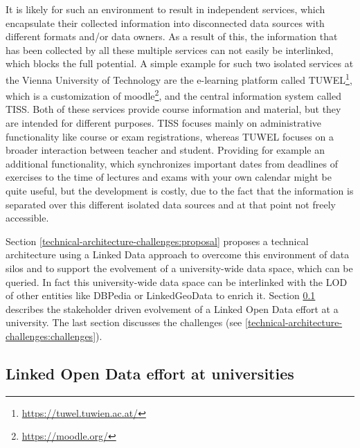 \documentclass{article}
\begin{document}
It is likely for such an environment to result in independent services, which encapsulate their collected information into disconnected data sources with different formats and/or data owners. As a result of this, the information that has been collected by all these multiple services can not easily be interlinked, which blocks the full potential. A simple example for such two isolated services at the Vienna University of Technology are the e-learning platform called TUWEL\footnote{\url{https://tuwel.tuwien.ac.at/}}, which is a customization of moodle\footnote{\url{https://moodle.org/}}, and the central information system called TISS. Both of these services provide course information and material, but they are intended for different purposes. TISS focuses mainly on administrative functionality like course or exam registrations, whereas TUWEL focuses on a broader interaction between teacher and student. Providing for example an additional functionality, which synchronizes important dates from deadlines of exercises to the time of lectures and exams with your own calendar might be quite useful, but the development is costly, due to the fact that the information is separated over this different isolated data sources and at that point not freely accessible. 

Section \ref{technical-architecture-challenges:proposal} proposes a technical architecture using a Linked Data approach to overcome this environment of data silos and to support the evolvement of a university-wide data space, which can be queried. In fact this university-wide data space can be interlinked with the LOD of other entities like DBPedia or LinkedGeoData to enrich it. Section \ref{technical-architecture-challenges:lod-effort} describes the stakeholder driven evolvement of a Linked Open Data effort at a university. The last section discusses the challenges (see \ref{technical-architecture-challenges:challenges}).

\subsection{Linked Open Data effort at universities}
\label{technical-architecture-challenges:lod-effort}
\end{document}
